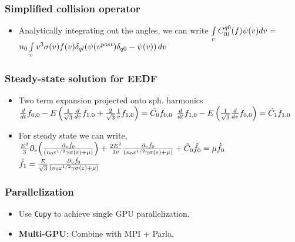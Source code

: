 \documentclass[landscape,archE,fontscale=0.285]{baposter} %
\begin{document}
\begin{poster}
{\begin{multicols}{2}
		\subsubsection*{Simplified collision operator}
		\begin{itemize}
			\item Analytically integrating out the angles, we can write 
			$
			\myint_{v} C^{q0}_{l0}\of{f} \psi(v) dv  = $\\$n_0 \myint_{v} v^3 \sigma\of{v} f\of{v} \delta_{ql}
			\of{\psi\of{v^{post}}\delta_{q0} - \psi\of{v}} \diff{v}$
		\end{itemize}
		\subsubsection*{Steady-state solution for EEDF}
		\begin{itemize}
			\item Two term expansion projected onto sph. harmonics\\
			$
			\frac{d}{dt} f_{0,0} - E 
			\left( \frac{1}{\sqrt{3}} \frac{d}{dv} f_{1,0} 
			+  \frac{2}{\sqrt{3}} \frac{1}{v} f_{1,0} \right) = \tilde{C_0} f_{0,0}
			$
			$\frac{d}{dt} f_{1,0} - E 
			\left( \frac{1}{\sqrt{3}} \frac{d}{dv} f_{0,0} \right) =  \tilde{C_1} f_{1,0}
			$
			\item For steady state we can write, \\
			$\frac{E^2}{3} \partial_{v} \of{\frac{\partial_v \hat f_0}{(n_0 \varepsilon^{1/2}\gamma \sigma\of{\varepsilon} + \mu)}} + \frac{2E^2}{3v} \frac{\partial_v \hat{f_0}}{(n_0 \varepsilon^{1/2}\gamma \sigma\of{\varepsilon} + \mu)} + \tilde C_0 \hat{f_0} = \mu \hat{f_0}$\\
			$\hat{f_1} = \frac{E}{\sqrt{3}} \frac{\partial_{v}\hat{f_0}}{(n_0 \varepsilon^{1/2}\gamma \sigma\of{\varepsilon} + \mu)}$
			
		\end{itemize}
		\subsubsection*{Parallelization}
		\begin{itemize}
			\item Use \texttt{Cupy} to achieve single GPU parallelization. 
			\item \textbf{Multi-GPU}: Combine with MPI + Parla.  
		\end{itemize}
	\end{multicols}
}


\end{poster}
\end{document}
